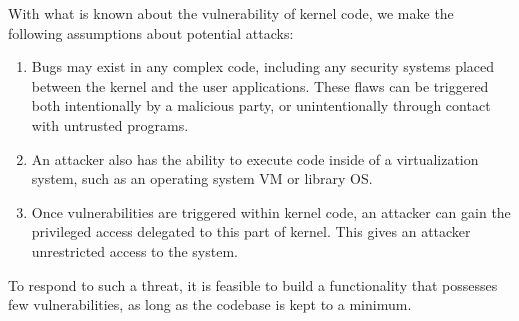 With what is known about the vulnerability of kernel code, we make the
following assumptions about potential attacks:

\begin{enumerate}
\item  Bugs may exist in any complex code, including any security systems
placed between the kernel and the user applications. These flaws can be triggered
both intentionally by a malicious party, or unintentionally through contact with
untrusted programs.

\item An attacker also has the ability to execute code inside
of a virtualization system, such as an operating system VM or library OS.

\item Once vulnerabilities are triggered within kernel code, an attacker can gain the
privileged access delegated to this part of kernel. This gives an attacker unrestricted
access to the system.

\end{enumerate}

To respond to such a threat, it is feasible to build a functionality that
possesses few vulnerabilities, as long as the codebase is kept to a minimum.

